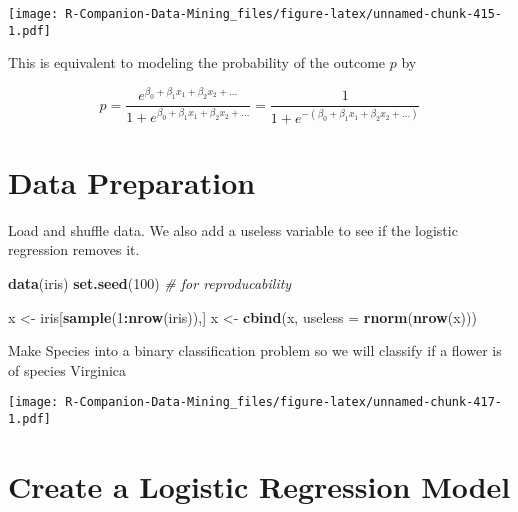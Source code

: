 \documentclass[
  notitlepage]{book}
\newenvironment{Shaded}{\begin{snugshade}}{\end{snugshade}}
\newcommand{\CommentTok}[1]{\textcolor[rgb]{0.56,0.35,0.01}{\textit{#1}}}
\newcommand{\DataTypeTok}[1]{\textcolor[rgb]{0.13,0.29,0.53}{#1}}
\newcommand{\DecValTok}[1]{\textcolor[rgb]{0.00,0.00,0.81}{#1}}
\newcommand{\KeywordTok}[1]{\textcolor[rgb]{0.13,0.29,0.53}{\textbf{#1}}}
\newcommand{\NormalTok}[1]{#1}
\newcommand{\OperatorTok}[1]{\textcolor[rgb]{0.81,0.36,0.00}{\textbf{#1}}}
\newcommand{\OtherTok}[1]{\textcolor[rgb]{0.56,0.35,0.01}{#1}}
\newcommand{\StringTok}[1]{\textcolor[rgb]{0.31,0.60,0.02}{#1}}
\begin{document}
\texttt{[image: R-Companion-Data-Mining\_files/figure-latex/unnamed-chunk-415-1.pdf]}

This is equivalent to modeling the probability of the outcome \(p\) by

\[ p = \frac{e^{\beta_0 + \beta_1 x_1 + \beta_2 x_2 + ...}}{1 +  e^{\beta_0 + \beta_1 x_1 + \beta_2 x_2 + ...}} = \frac{1}{1+e^{-(\beta_0 + \beta_1 x_1 + \beta_2 x_2 + ...)}}\]

\hypertarget{data-preparation-1}{%
\section{Data Preparation}\label{data-preparation-1}}

Load and shuffle data. We also add a useless variable to see if the logistic regression removes it.

\begin{Shaded}
\begin{Highlighting}[]
\KeywordTok{data}\NormalTok{(iris)}
\KeywordTok{set.seed}\NormalTok{(}\DecValTok{100}\NormalTok{) }\CommentTok{\# for reproducability}

\NormalTok{x \textless{}{-}}\StringTok{ }\NormalTok{iris[}\KeywordTok{sample}\NormalTok{(}\DecValTok{1}\OperatorTok{:}\KeywordTok{nrow}\NormalTok{(iris)),]}
\NormalTok{x \textless{}{-}}\StringTok{ }\KeywordTok{cbind}\NormalTok{(x, }\DataTypeTok{useless =} \KeywordTok{rnorm}\NormalTok{(}\KeywordTok{nrow}\NormalTok{(x)))}
\end{Highlighting}
\end{Shaded}

Make Species into a binary classification problem so we will
classify if a flower is of species Virginica

\begin{Shaded}
\end{Shaded}

\texttt{[image: R-Companion-Data-Mining\_files/figure-latex/unnamed-chunk-417-1.pdf]}

\hypertarget{create-a-logistic-regression-model}{%
\section{Create a Logistic Regression Model}\label{create-a-logistic-regression-model}}
\end{document}
